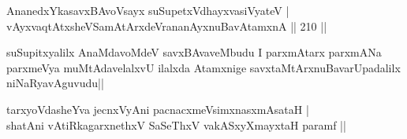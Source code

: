 \begin{shl}
AnanedxYkasavxBAvoV\s sayx suSupetxV\s dhayxvasiVyateV |\\
vAyxvaqtAtxsheVSamAtArxdeVrananAyxnuBavAtamxnA \hfill || 210 ||
\end{shl}

\begin{artha}
suSupitxyalilx AnaMdavoMdeV savxBAvaveMbudu I parxmAtarx parxmANa parxmeVya muMtAdavelalxvU ilalxda Atamxnige savxtaMtArxnuBavarUpadalilx niNaRyavAguvudu||
\end{artha}


\begin{shl}
tarxyoVdasheYva jecnxVyAni pacnacxmeV\s simxnasxmAsataH |\\
shatAni vAtiRkagarxnethxV SaSeThxV vakASxyXmayxtaH paramf ||
\end{shl}



